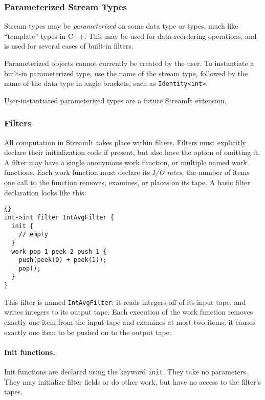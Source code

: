 \documentclass[11pt]{article}
\begin{document}
\subsubsection{Parameterized Stream Types}

Stream types may be \emph{parameterized} on some data type or types,
much like ``template'' types in C++.  This may be used for
data-reordering operations, and is used for several cases of built-in
filters.

Parameterized objects cannot currently be created by the user.  To
instantiate a built-in parameterized type, use the name of the stream
type, followed by the name of the data type in angle brackets, such as
\lstinline|Identity<int>|.

\begin{note}
User-instantiated parameterized types are a future StreamIt
extension.
\end{note}

\subsubsection{Filters}

All computation in StreamIt takes place within filters.  Filters must
explicitly declare their initialization code if present, but also have
the option of omitting it.  A filter may have a single anonymous work
function, or multiple named work functions.  Each work function must
declare its \emph{I/O rates}, the number of items one call to the
function removes, examines, or places on its tape.  A basic filter
declaration looks like this:

\begin{lstlisting}{}
int->int filter IntAvgFilter {
  init {
    // empty
  }
  work pop 1 peek 2 push 1 {
    push(peek(0) + peek(1));
    pop();
  }
}
\end{lstlisting}

This filter is named \lstinline|IntAvgFilter|; it reads integers off of its
input tape, and writes integers to its output tape.  Each execution of
the work function removes exactly one item from the input tape and
examines at most two items; it causes exactly one item to be pushed on
to the output tape.

\paragraph{Init functions.}  Init functions are declared using the
keyword \lstinline|init|.  They take no parameters.  They may initialize
filter fields or do other work, but have no access to the filter's
tapes.
\end{document}
